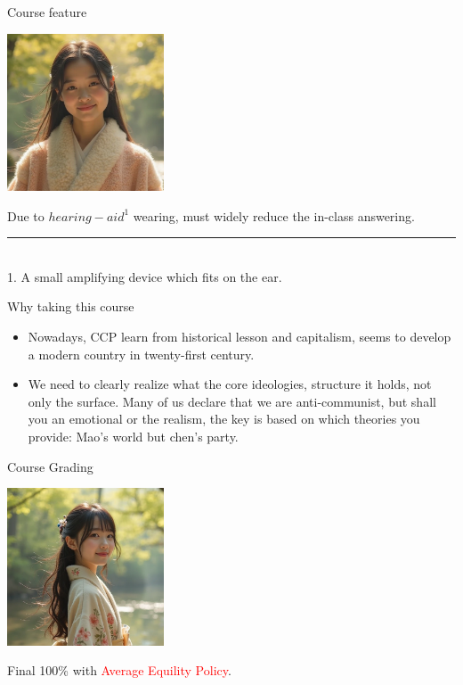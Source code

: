 \documentclass{beamer}
\begin{document}
\begin{frame}{Course feature}
\begin{center}
\includegraphics[width=0.35\textwidth]{feature.png}
\end{center}
\begin{center}
Due to $hearing-aid^{1}$ wearing, must widely reduce the in-class answering.
\end{center}
\vspace{1em}
\rule{0.35\textwidth}{0.5pt} \\
\scriptsize 1. A small amplifying device which fits on the ear.
\end{frame}
\begin{frame}{Why taking this course}
\begin{itemize}
\item Nowadays, CCP learn from historical lesson and capitalism, seems to develop a modern country in twenty-first century.
\item We need to clearly realize what the core ideologies, structure it holds, not only the surface. Many of us declare that we are anti-communist, but shall you an emotional or the realism, the key is based on which theories you provide: Mao's world but chen's party.
\end{itemize}
\end{frame}
\begin{frame}{Course Grading}
\begin{center}
\includegraphics[width=0.35\textwidth]{examination.png}
\end{center}
\begin{center}
Final 100\% with \textcolor{red}{Average Equility Policy}.
\end{center}
\end{frame}
\end{document}
